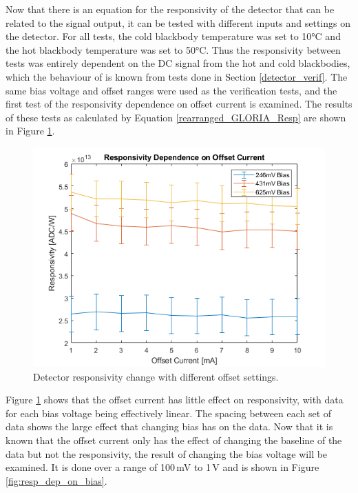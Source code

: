Now that there is an equation for the responsivity of the detector that can be related to the signal output, it can be tested with different inputs and settings on the detector. For all tests, the cold blackbody temperature was set to 10°C and the hot blackbody temperature was set to 50°C. Thus the responsivity between tests was entirely dependent on the DC signal from the hot and cold blackbodies, which the behaviour of is known from tests done in Section \ref{detector_verif}. The same bias voltage and offset ranges were used as the verification tests, and the first test of the responsivity dependence on offset current is examined. The results of these tests as calculated by Equation \ref{rearranged_GLORIA_Resp} are shown in Figure \ref{fig:resp_dep_on_offset}.

\begin{figure}[h]
  \includegraphics[width=\linewidth]{chap6_images/verification/resp_dependence_on_offset.png}
  \caption{Detector responsivity change with different offset settings.}
  \label{fig:resp_dep_on_offset}
\end{figure}

Figure \ref{fig:resp_dep_on_offset} shows that the offset current has little effect on responsivity, with data for each bias voltage being effectively linear. The spacing between each set of data shows the large effect that changing bias has on the data. Now that it is known that the offset current only has the effect of changing the baseline of the data but not the responsivity, the result of changing the bias voltage will be examined. It is done over a range of 100\,mV to 1\,V and is shown in Figure \ref{fig:resp_dep_on_bias}.


